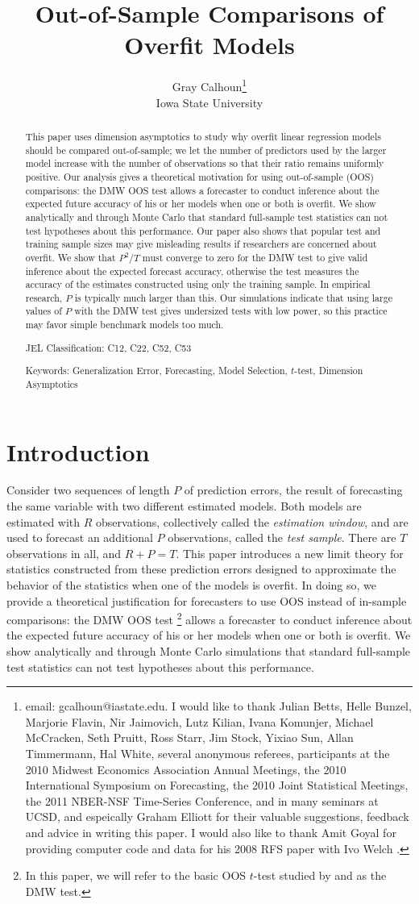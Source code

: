 \documentclass[12pt]{article}
\title{Out-of-Sample Comparisons of Overfit Models}
\author{Gray Calhoun\thanks{email: gcalhoun@iastate.edu. I
    would like to thank Julian Betts, Helle Bunzel, Marjorie Flavin,
    Nir Jaimovich, Lutz Kilian, Ivana Komunjer, Michael McCracken,
    Seth Pruitt, Ross Starr, Jim Stock, Yixiao Sun, Allan Timmermann,
    Hal White, several anonymous referees, participants at the 2010
    Midwest Economics Association Annual Meetings, the 2010
    International Symposium on Forecasting, the 2010 Joint Statistical
    Meetings, the 2011 NBER-NSF Time-Series
    Conference, and in many seminars at UCSD, and espeically
    Graham Elliott for their valuable suggestions, feedback and advice
    in writing this paper.  I would also like to thank Amit Goyal for
    providing computer code and data for his 2008 RFS paper
    with Ivo Welch \citep{GoW:08}.} \\ Iowa State University}
\begin{document}
\maketitle

\begin{abstract}\noindent
  This paper uses dimension asymptotics to study why overfit linear
  regression models should be compared out-of-sample; we let the
  number of predictors used by the larger model increase with the
  number of observations so that their ratio remains uniformly
  positive.  Our analysis gives a theoretical motivation for using
  out-of-sample (OOS) comparisons: the DMW OOS test allows a forecaster to
  conduct inference about the expected future accuracy of his or her
  models when one or both is overfit.  We show analytically and
  through Monte Carlo that standard full-sample test statistics can
  not test hypotheses about this performance.  Our paper also shows
  that popular test and training sample sizes may give misleading
  results if researchers are concerned about overfit.  We show that
  $P^2/T$ must converge to zero for the DMW test to give valid
  inference about the expected forecast accuracy, otherwise the test
  measures the accuracy of the estimates constructed using only the
  training sample.  In empirical research, $P$ is typically much
  larger than this.  Our simulations indicate that using large values
  of $P$ with the DMW test gives undersized tests with low power, so
  this practice may favor simple benchmark models too much.

\noindent JEL Classification: C12, C22, C52, C53

\noindent Keywords: Generalization Error, Forecasting, Model
Selection, $t$-test, Dimension Asymptotics
\end{abstract}
\newpage

\section{Introduction}
\label{sec:introduction}

Consider two sequences of length $P$ of prediction errors, the result
of forecasting the same variable with two different estimated models.
Both models are estimated with $R$ observations, collectively called
the {\em estimation window}, and are used to forecast an additional
$P$ observations, called the {\em test sample}.  There are $T$
observations in all, and $R+P=T$.  This paper introduces a new limit
theory for statistics constructed from these prediction errors
designed to approximate the behavior of the statistics when one of the
models is overfit.  In doing so, we provide a theoretical
justification for forecasters to use OOS instead of in-sample
comparisons: the DMW OOS test%
\footnote{In this paper, we will refer to the basic OOS $t$-test
  studied by \citet{DiM:95} and \citet{Wes:96} as the DMW test.} %
allows a forecaster to conduct
inference about the expected future accuracy of his or her models when
one or both is overfit.  We show analytically and through Monte Carlo simulations
that standard full-sample test statistics can not test hypotheses
about this performance.
\end{document}
